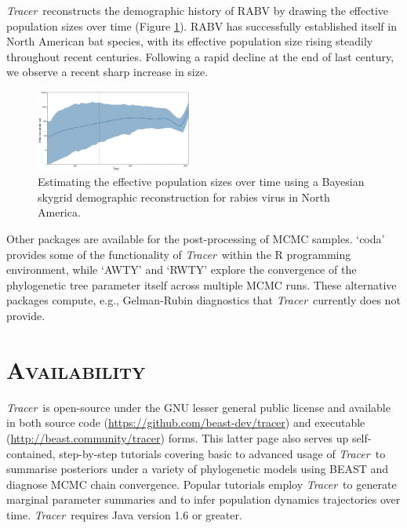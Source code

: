 \documentclass[webpdf,mynatbib,nosurname,nogrid,noCE,noMSC]{SYS}
\newcommand{\tracer}{\emph{Tracer}}
\begin{document}
\tracer\ reconstructs the demographic history of RABV by drawing the effective population sizes over time (Figure \ref{fig:rabv}).
RABV has successfully established itself in North American bat species, with its effective population size rising steadily throughout recent centuries.
Following a rapid decline at the end of last century, we observe a recent sharp increase in size.

\begin{figure}[t]
\centerline{
\includegraphics[width=0.46\textwidth]{./figures/rabv-skygrid2.pdf}
}
\vspace{-0.25cm}
\caption{Estimating the effective population sizes over time using a Bayesian skygrid demographic reconstruction for rabies virus in North America.}
\label{fig:rabv}
\end{figure}


Other packages are available for the post-processing of MCMC samples.
 `coda' \citep{plummer2006coda} provides some of the functionality of \tracer\ within the R programming environment, while `AWTY' \citep{nylander2007awty} and `RWTY' \citep{warren2017rwty} explore the convergence of the phylogenetic tree parameter itself across multiple MCMC runs.
These alternative packages compute, e.g., Gelman-Rubin diagnostics \citep{gelman1992inference} that \tracer\ currently does not provide.

\vspace{-0.55cm}

\section*{\textsc{Availability}}

\tracer\ is open-source under the GNU lesser general public license and available in both source code (\url{https://github.com/beast-dev/tracer}) and executable (\url{http://beast.community/tracer}) forms.
This latter page also serves up self-contained, step-by-step tutorials covering basic to advanced usage of \tracer\ to summarise posteriors under a variety of phylogenetic models using BEAST and diagnose MCMC chain convergence.
Popular tutorials employ \tracer\ to generate marginal parameter summaries and to infer population dynamics trajectories over time.
\tracer\ requires Java version 1.6 or greater.
\end{document}
